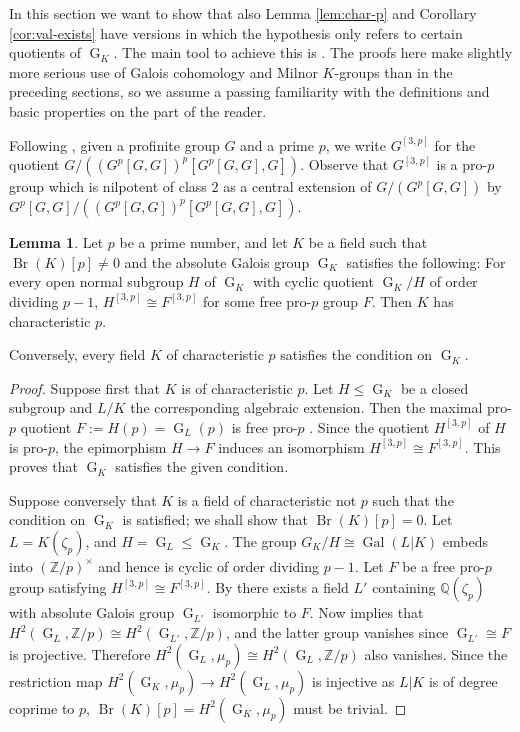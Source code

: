 \documentclass[a4paper, british, oneside]{amsart}
\newcommand{\Z}{\mathbb{Z}}
\newcommand{\Q}{\mathbb{Q}}
\DeclareMathOperator{\G}{G}
\DeclareMathOperator{\Gal}{Gal}
\DeclareMathOperator{\Br}{Br}
\theoremstyle{definition}
\newtheorem{lemma}[theorem]{Lemma}
\theoremstyle{remark}
\begin{document}
In this section we want to show that also Lemma \ref{lem:char-p} and Corollary \ref{cor:val-exists} have versions in which the hypothesis only refers to certain quotients of $\G_K$.
The main tool to achieve this is \cite{CheboluEfratMinac_QuotientsDetermineCohomology}.
The proofs here make slightly more serious use of Galois cohomology and Milnor $K$-groups than in the preceding sections,
so we assume a passing familiarity with the definitions and basic properties on the part of the reader.

Following \cite[§4]{CheboluEfratMinac_QuotientsDetermineCohomology}, given a profinite group $G$ and a prime $p$, we write $G^{[3,p]}$ for the quotient $G/((G^p[G,G])^p [G^p[G,G], G])$.
Observe that $G^{[3,p]}$ is a pro-$p$ group which is nilpotent of class $2$ as a central extension of $G/(G^p[G,G])$ by $G^p[G,G]/((G^p[G,G])^p [G^p[G,G], G])$.

\begin{lemma}\label{lem:char-p-sharpened}
  Let $p$ be a prime number,
  and let $K$ be a field such that $\Br(K)[p] \neq 0$ and
  the absolute Galois group $\G_K$ satisfies the following:
  For every open normal subgroup $H$ of $\G_K$ with cyclic quotient
  $\G_K/H$ of order dividing $p-1$,
  $H^{[3,p]} \cong F^{[3,p]}$
  for some free pro-$p$ group $F$.
  Then $K$ has characteristic $p$.

  Conversely, every field $K$ of characteristic $p$ satisfies
  the condition on $\G_K$.
\end{lemma}
\begin{proof}
  Suppose first that $K$ is of characteristic $p$.
  Let $H \leq \G_K$ be a closed subgroup and $L/K$ the corresponding algebraic extension.
  Then the maximal pro-$p$ quotient $F := H(p) = \G_L(p)$ is free pro-$p$ \cite[Corollary 6.1.3]{NSW}.
  Since the quotient $H^{[3,p]}$ of $H$ is pro-$p$,
  the epimorphism $H \to F$ induces an isomorphism $H^{[3,p]} \cong F^{[3,p]}$.
  This proves that $\G_K$ satisfies the given condition.

  Suppose conversely that $K$ is a field of characteristic not $p$
  such that the condition on $\G_K$ is satisfied;
  we shall show that $\Br(K)[p] = 0$.
  Let $L = K(\zeta_p)$, and $H = \G_L \leq \G_K$.
  The group $G_K/H \cong \Gal(L|K)$ embeds into $(\Z/p)^\times$
  and hence is cyclic of order dividing $p-1$.
  Let $F$ be a free pro-$p$ group satisfying $H^{[3,p]} \cong F^{[3,p]}$.
  By \cite[Corollary 23.1.2]{FriedJarden} there exists a field $L'$ containing $\Q(\zeta_p)$ with absolute Galois group $\G_{L'}$ isomorphic to $F$.
  Now \cite[Theorem A]{CheboluEfratMinac_QuotientsDetermineCohomology} implies that
  $H^2(\G_L, \Z/p) \cong H^2(\G_{L'}, \Z/p)$,
  and the latter group vanishes since $\G_{L'} \cong F$ is projective.
  Therefore $H^2(\G_L, \mu_p) \cong H^2(\G_L, \Z/p)$ also vanishes.
  Since the restriction map $H^2(\G_K, \mu_p) \to H^2(\G_L, \mu_p)$ is injective
  as $L|K$ is of degree coprime to $p$,
  $\Br(K)[p] = H^2(\G_K, \mu_p)$ must be trivial.
\end{proof}
\end{document}
